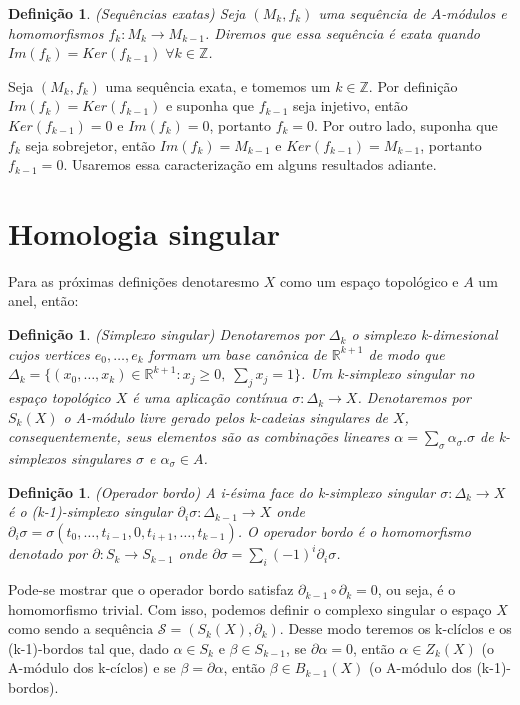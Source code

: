 \documentclass[12pt]{book}
\newtheorem{definicao}[teorema]{Definição}
\newcommand{\inteiros}{\mathbb{Z}}
\newcommand{\real}[1]{\mathbb{R}^{#1}}
\begin{document}
	\begin{definicao}
		(Sequências exatas) Seja $(M_{k}, f_{k})$ uma sequência de $A$-módulos e homomorfismos $f_{k}:M_{k}\to M_{k-1}$. Diremos que essa sequência é exata quando $Im(f_{k})=Ker(f_{k-1}) \; \forall k \in \inteiros$.
	\end{definicao}
	
	Seja $(M_{k}, f_{k})$ uma sequência exata, e tomemos um $k \in \inteiros$. Por definição $Im(f_{k}) = Ker(f_{k-1})$ e suponha que $f_{k-1}$ seja injetivo, então $Ker(f_{k-1}) = 0$ e $Im(f_{k}) = 0$, portanto $f_{k} = 0$. Por outro lado, suponha que $f_{k}$ seja sobrejetor, então $Im(f_{k}) = M_{k-1}$ e $Ker(f_{k-1})=M_{k-1}$, portanto $f_{k-1} = 0$. Usaremos essa caracterização em alguns resultados adiante.
	
	\section{Homologia singular}
	Para as próximas definições denotaresmo $X$ como um espaço topológico e $A$ um anel, então:
	\begin{definicao}
		(Simplexo singular) Denotaremos por $\Delta_{k}$ o simplexo k-dimesional cujos vertices $e_{0}, \dots, e_{k}$ formam um base canônica de $\real{k+1}$ de modo que $\Delta_{k} = \{(x_{0}, \dots, x_{k}) \in \real{k+1}: x_{j}\geq 0, \;\sum_{j}x_{j}=1\}$. Um k-simplexo singular no espaço topológico $X$ é uma aplicação contínua $\sigma:\Delta_{k} \to X$. Denotaremos por $S_{k}(X)$ o A-módulo livre gerado pelos k-cadeias singulares de $X$, consequentemente, seus elementos são as combinações lineares $\alpha = \sum_{\sigma} \alpha_{\sigma}.\sigma $ de k-simplexos singulares $\sigma$ e $\alpha_{\sigma} \in A$.
	\end{definicao}
	
	\begin{definicao}
		(Operador bordo) A i-ésima face do k-simplexo singular $\sigma: \Delta_{k} \to X$ é o (k-1)-simplexo singular $\partial_{i}\sigma:\Delta_{k-1} \to X$ onde $\partial_{i}\sigma = \sigma(t_{0}, \dots, t_{i-1},0,t_{i+1}, \dots, t_{k-1})$. O operador bordo é o homomorfismo denotado por $\partial : S_{k} \to S_{k-1}$ onde $\partial\sigma = \sum_{i} (-1)^{i}\partial_{i}\sigma$.
	\end{definicao}
	Pode-se mostrar que o operador bordo satisfaz $\partial_{k-1}\circ\partial_{k} = 0$, ou seja, é o homomorfismo trivial. Com isso, podemos definir o complexo singular o espaço $X$ como sendo a sequência $\mathcal{S} = (S_{k}(X), \partial_{k})$. Desse modo teremos os k-clíclos e os (k-1)-bordos tal que, dado $\alpha \in S_{k}$ e $\beta \in S_{k-1}$, se $\partial\alpha = 0$, então $\alpha \in Z_{k}(X)$ (o A-módulo dos k-cíclos) e se $\beta = \partial\alpha$, então $\beta\in B_{k-1}(X)$ (o A-módulo dos (k-1)-bordos).
	
\end{document}
